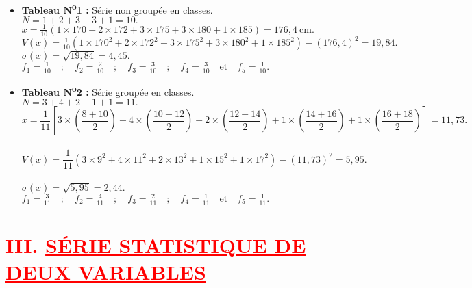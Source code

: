 \documentclass[12pt,a4paper]{article}
\begin{document}
\begin{itemize}
    \item \textbf{Tableau N\textsuperscript{o}1 :} Série non groupée en classes.\\
    \( N = 1 + 2 + 3 + 3 + 1 = 10. \)\\[0.2cm]
    \( 
    \bar{x} = \frac{1}{10} (1 \times 170 + 2 \times 172 + 3 \times 175 + 3 \times 180 + 1 \times 185) = 176{,}4~\text{cm}.
    \)\\[0.2cm]
    \( 
    V(x) = \frac{1}{10} (1 \times 170^2 + 2 \times 172^2 + 3 \times 175^2 + 3 \times 180^2 + 1 \times 185^2) - (176{,}4)^2 = 19{,}84.
    \)\\[0.2cm]
    \( 
    \sigma(x) = \sqrt{19{,}84} = 4{,}45.
    \)\\[0.2cm]
    \( 
    f_1 = \frac{1}{10} \quad ; \quad 
    f_2 = \frac{2}{10} \quad ; \quad 
    f_3 = \frac{3}{10} \quad ; \quad 
    f_4 = \frac{3}{10} \quad \text{et} \quad 
    f_5 = \frac{1}{10}.
    \)

    \vspace{0.5cm}
    
    \item \textbf{Tableau N\textsuperscript{o}2 :} Série groupée en classes.\\
    \( N = 3 + 4 + 2 + 1 + 1 = 11. \)\\[0.2cm]
    \[
    \bar{x} = \frac{1}{11} \left[ 
    3 \times \left( \frac{8 + 10}{2} \right)
    + 4 \times \left( \frac{10 + 12}{2} \right)
    + 2 \times \left( \frac{12 + 14}{2} \right)
    + 1 \times \left( \frac{14 + 16}{2} \right)
    + 1 \times \left( \frac{16 + 18}{2} \right)
    \right] = 11{,}73.
    \]\\[0.2cm]
    \[
    V(x) = \frac{1}{11} \left( 
    3 \times 9^2 + 4 \times 11^2 + 2 \times 13^2 + 1 \times 15^2 + 1 \times 17^2 
    \right) - (11{,}73)^2 = 5{,}95.
    \]\\[0.2cm]
    \( 
    \sigma(x) = \sqrt{5{,}95} = 2{,}44.
    \)\\[0.2cm]
    \( 
    f_1 = \frac{3}{11} \quad ; \quad 
    f_2 = \frac{4}{11} \quad ; \quad 
    f_3 = \frac{2}{11} \quad ; \quad 
    f_4 = \frac{1}{11} \quad \text{et} \quad 
    f_5 = \frac{1}{11}.
    \)
\end{itemize}

\section*{\textcolor{red}{III. \underline{SÉRIE STATISTIQUE DE DEUX VARIABLES}}}
\end{document}
